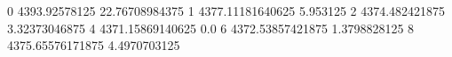 0 4393.92578125 22.76708984375
1 4377.11181640625 5.953125
2 4374.482421875 3.32373046875
4 4371.15869140625 0.0
6 4372.53857421875 1.3798828125
8 4375.65576171875 4.4970703125
